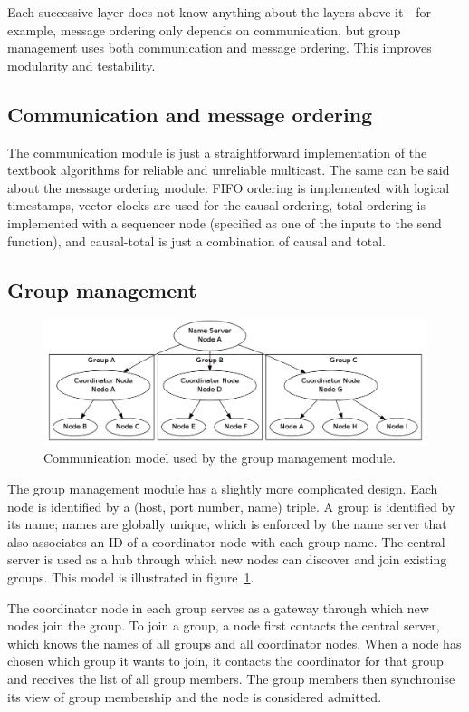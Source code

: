 \documentclass[10pt, oneside]{article}
\begin{document}
Each successive layer does not know anything about the layers above it - for
example, message ordering only depends on communication, but group management
uses both communication and message ordering. This improves modularity and
testability.

\subsection{Communication and message ordering}

The communication module is just a straightforward implementation of the
textbook algorithms for reliable and unreliable multicast\cite{Textbook}. The
same can be said about the message ordering module: FIFO ordering is implemented
with logical timestamps, vector clocks are used for the causal ordering, total
ordering is implemented with a sequencer node (specified as one of the inputs to
the send function), and causal-total is just a combination of causal and total.

\subsection{Group management}

\begin{figure}[h]
\centering
\includegraphics[width=12cm]{graph1}
\caption{Communication model used by the group management module.}
\label{fig:group}
\end{figure}

The group management module has a slightly more complicated design. Each node is
identified by a (host, port number, name) triple. A group is identified by its
name; names are globally unique, which is enforced by the name server that also
associates an ID of a coordinator node with each group name. The central server
is used as a hub through which new nodes can discover and join existing
groups. This model is illustrated in figure~\ref{fig:group}.

The coordinator node in each group serves as a gateway through which new nodes
join the group. To join a group, a node first contacts the central server, which
knows the names of all groups and all coordinator nodes. When a node has chosen
which group it wants to join, it contacts the coordinator for that group and
receives the list of all group members. The group members then synchronise its
view of group membership and the node is considered admitted.
\end{document}
